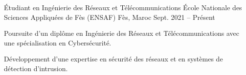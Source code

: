 
\begin{cventries}

  \cventry
    {Étudiant en Ingénierie des Réseaux et Télécommunications} %
    {École Nationale des Sciences Appliquées de Fès (ENSAF)} %
    {Fès, Maroc} %
    {Sept. 2021 – Présent} %
    {
      \begin{cvitems} %
        \item {Poursuite d’un diplôme en Ingénierie des Réseaux et Télécommunications avec une spécialisation en Cybersécurité.}  
        \item {Développement d’une expertise en sécurité des réseaux et en systèmes de détection d'intrusion.}  
      \end{cvitems}
    }
\end{cventries}
